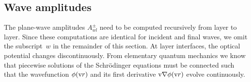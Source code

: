 \subsection{Wave amplitudes}\label{Sacrolay}

%
%
%

The plane-wave amplitudes $A^\pm_{wl}$ need to be computed recursively
from layer to layer.
Since these computations are identical for incident and final waves,
we omit the subscript~$w$ in the remainder of this section.
At layer interfaces, the optical potential changes discontinuously.
From elementary quantum mechanics we know that
piecewise solutions of the Schrödinger equations must be connected
such that the wavefunction $\phi(\text{v}{r})$ and its first derivative
$\text{v}{\nabla}\phi(\text{v}{r})$ evolve continuously.


